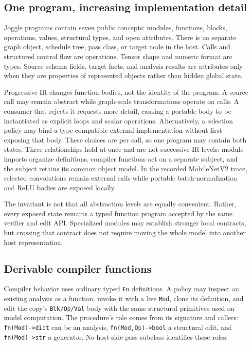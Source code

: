\documentclass[sigplan,anonymous,review]{acmart}
\begin{document}
\subsection{One program, increasing implementation detail}
Joggle programs contain seven public concepts: modules, functions, blocks,
operations, values, structural types, and open attributes. There is no separate
graph object, schedule tree, pass class, or target node in the host. Calls and
structured control flow are operations. Tensor shape and numeric format are
types. Source schema fields, target facts, and analysis results are attributes
only when they are properties of represented objects rather than hidden global
state.

Progressive IR changes function bodies, not the identity of the program. A
source call may remain abstract while graph-scale transformations operate on
calls. A consumer that rejects it requests more detail, causing a portable body
to be instantiated as explicit loops and scalar operations. Alternatively, a
selection policy may bind a type-compatible external implementation without
first exposing that body. These choices are per call, so one program may contain
both states. Three relationships hold at once and are not successive IR levels:
module imports organize definitions, compiler functions act on a separate
subject, and the subject retains its common object model. In the
recorded MobileNetV2 trace, selected convolutions remain external calls while
portable batch-normalization and ReLU bodies are exposed locally.

The invariant is not that all abstraction levels are equally convenient.
Rather, every exposed state remains a typed function program accepted by the
same verifier and edit API. Specialized modules may establish stronger local
contracts, but crossing that contract does not require moving the whole model
into another host representation.

\subsection{Derivable compiler functions}
\label{sec:metaprogramming}
Compiler behavior uses ordinary typed \texttt{Fn} definitions. A policy may
inspect an existing analysis as a function, invoke it with a live \texttt{Mod},
clone its definition, and edit the copy's \texttt{Blk/Op/Val} body with the
same structural primitives used on model computation. The procedure's role
comes from its signature and callers: \texttt{fn(Mod)->dict} can be an
analysis, \texttt{fn(Mod,Op)->bool} a structural edit, and
\texttt{fn(Mod)->str} a generator. No host-side pass subclass identifies
these roles.
\end{document}
